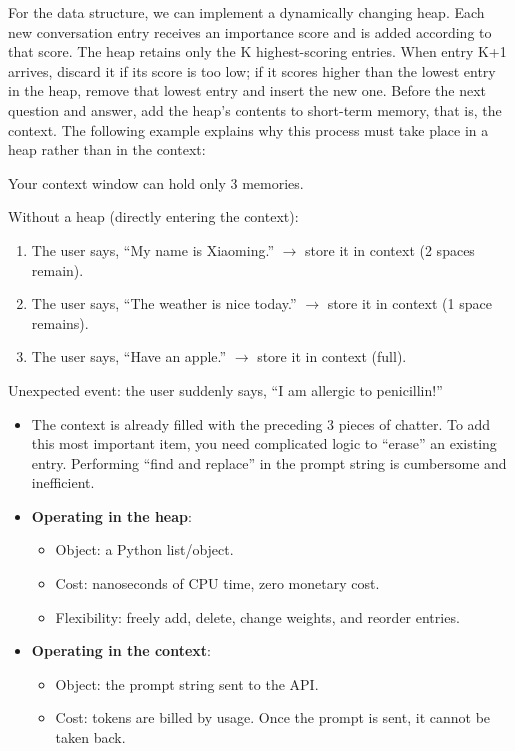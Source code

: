 For the data structure, we can implement a dynamically changing heap. Each new conversation entry receives an importance score and is added according to that score. The heap retains only the K highest-scoring entries. When entry K+1 arrives, discard it if its score is too low; if it scores higher than the lowest entry in the heap, remove that lowest entry and insert the new one. Before the next question and answer, add the heap's contents to short-term memory, that is, the context. The following example explains why this process must take place in a heap rather than in the context:

Your context window can hold only 3 memories.

Without a heap (directly entering the context):

\begin{enumerate}
\def\labelenumi{\arabic{enumi}.}
\tightlist
\item
  The user says, ``My name is Xiaoming.'' \(\to\) store it in context (2 spaces remain).
\item
  The user says, ``The weather is nice today.'' \(\to\) store it in context (1 space remains).
\item
  The user says, ``Have an apple.'' \(\to\) store it in context (full).
\end{enumerate}

Unexpected event: the user suddenly says, ``I am allergic to penicillin!''

\begin{itemize}
\item
  The context is already filled with the preceding 3 pieces of chatter. To add this most important item, you need complicated logic to ``erase'' an existing entry. Performing ``find and replace'' in the prompt string is cumbersome and inefficient.
\item
{}
  \textbf{Operating in the heap}:

  \begin{itemize}
  \tightlist
  \item
    Object: a Python list/object.
  \item
    Cost: nanoseconds of CPU time, zero monetary cost.
  \item
    Flexibility: freely add, delete, change weights, and reorder entries.
  \end{itemize}
\item
{}
  \textbf{Operating in the context}:

  \begin{itemize}
  \tightlist
  \item
    Object: the prompt string sent to the API.
  \item
    Cost: tokens are billed by usage. Once the prompt is sent, it cannot be taken back.
  \end{itemize}
\end{itemize}

